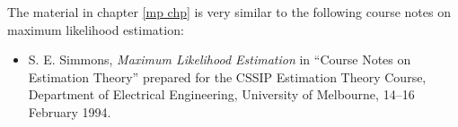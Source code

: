 The material in chapter \ref{mp chp} is very similar to the following 
course notes on maximum likelihood estimation:
\begin{itemize}
\item S. E. Simmons, {\em Maximum Likelihood Estimation\/} in ``Course Notes
on Estimation Theory'' prepared for the CSSIP Estimation Theory Course, 
Department of Electrical Engineering, University of Melbourne, 14--16
February 1994.
\end{itemize}

